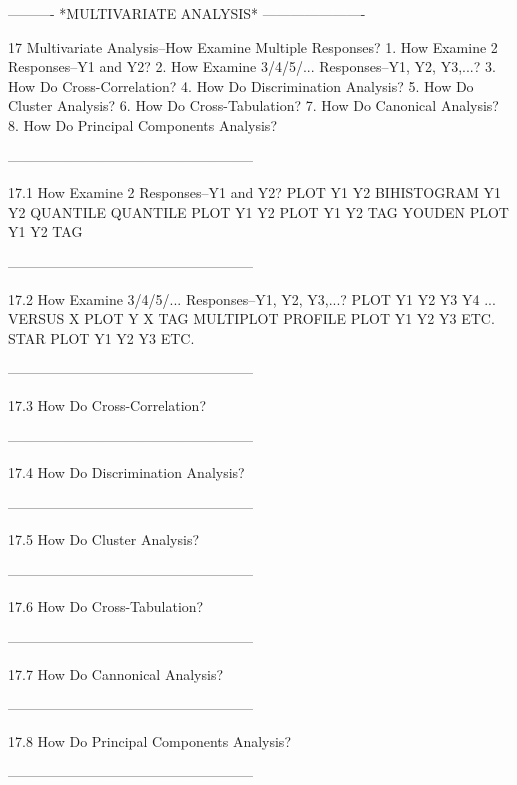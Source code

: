  
 
 
 
 
 
 
 
 
 
 
 
 
----------  *MULTIVARIATE ANALYSIS*  ----------------------
 
17
Multivariate Analysis--How Examine Multiple Responses?
   1. How Examine 2 Responses--Y1 and Y2?
   2. How Examine 3/4/5/... Responses--Y1, Y2, Y3,...?
   3. How Do Cross-Correlation?
   4. How Do Discrimination Analysis?
   5. How Do Cluster Analysis?
   6. How Do Cross-Tabulation?
   7. How Do Canonical Analysis?
   8. How Do Principal Components Analysis?
 
-----------------------------------------------------
 
17.1
How Examine 2 Responses--Y1 and Y2?
      PLOT Y1 Y2
      BIHISTOGRAM Y1 Y2
      QUANTILE QUANTILE PLOT Y1 Y2
      PLOT Y1 Y2 TAG
      YOUDEN PLOT Y1 Y2 TAG
 
-----------------------------------------------------
 
17.2
How Examine 3/4/5/... Responses--Y1, Y2, Y3,...?
   PLOT Y1 Y2 Y3 Y4 ... VERSUS X
   PLOT Y X TAG
   MULTIPLOT
   PROFILE PLOT Y1 Y2 Y3 ETC.
   STAR PLOT Y1 Y2 Y3 ETC.
 
-----------------------------------------------------
 
17.3
How Do Cross-Correlation?
 
-----------------------------------------------------
 
17.4
How Do Discrimination Analysis?
 
-----------------------------------------------------
 
17.5
How Do Cluster Analysis?
 
-----------------------------------------------------
 
17.6
How Do Cross-Tabulation?
 
-----------------------------------------------------
 
17.7
How Do Cannonical Analysis?
 
-----------------------------------------------------
 
17.8
How Do Principal Components Analysis?
 
-----------------------------------------------------
 
 
 
 
 
